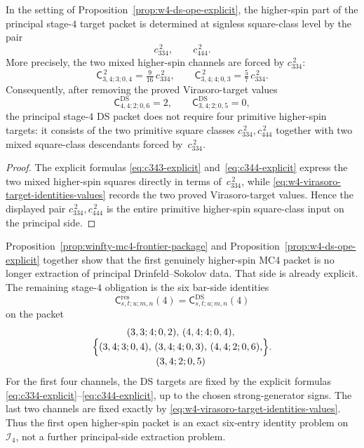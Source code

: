 \begin{corollary}
\label{cor:w4-ds-stage4-square-class-reduction}
In the setting of
Proposition~\ref{prop:w4-ds-ope-explicit}, the higher-spin part of the
principal stage-$4$ target packet is determined at signless
square-class level by the pair
\[
c_{334}^{\,2},
\qquad
c_{444}^{\,2}.
\]
More precisely, the two mixed higher-spin channels are forced by
$c_{334}^{\,2}$:
\[
\mathsf{C}_{3,4;3;0,4}^{\,2}
= \tfrac{9}{16}\,c_{334}^{\,2},
\qquad
\mathsf{C}_{3,4;4;0,3}^{\,2}
= \tfrac{5}{7}\,c_{334}^{\,2}.
\]
Consequently, after removing the proved Virasoro-target values
\[
\mathsf{C}^{\mathrm{DS}}_{4,4;2;0,6}=2,
\qquad
\mathsf{C}^{\mathrm{DS}}_{3,4;2;0,5}=0,
\]
the principal stage-$4$ DS packet does not require four primitive
higher-spin targets: it consists of the two primitive square classes
$c_{334}^{\,2},c_{444}^{\,2}$ together with two mixed square-class
descendants forced by~$c_{334}^{\,2}$.
\end{corollary}

\begin{proof}
The explicit formulas
\eqref{eq:c343-explicit} and~\eqref{eq:c344-explicit} express the two
mixed higher-spin squares directly in terms of~$c_{334}^{\,2}$, while
\eqref{eq:w4-virasoro-target-identities-values} records the two
proved Virasoro-target values. Hence the displayed pair
$c_{334}^{\,2},c_{444}^{\,2}$ is the entire primitive higher-spin
square-class input on the principal side.
\end{proof}

\begin{remark}
\label{rem:winfty-stage4-exact-identity-packet}
Proposition~\ref{prop:winfty-mc4-frontier-package} and
Proposition~\ref{prop:w4-ds-ope-explicit} together show that the first
genuinely higher-spin MC4 packet is no longer extraction of principal
Drinfeld--Sokolov data. That side is already explicit. The remaining
stage-$4$ obligation is the six bar-side identities
\[
\mathsf{C}^{\mathrm{res}}_{s,t;u;m,n}(4)
=
\mathsf{C}^{\mathrm{DS}}_{s,t;u;m,n}(4)
\]
on the packet
\[
\Bigl\{
\begin{gathered}
(3,3;4;0,2),\,
(4,4;4;0,4),\\
(3,4;3;0,4),\,
(3,4;4;0,3),\,
(4,4;2;0,6),\\
(3,4;2;0,5)
\end{gathered}
\Bigr\}.
\]
For the first four channels, the DS targets are fixed by the explicit
formulas \eqref{eq:c334-explicit}--\eqref{eq:c344-explicit}, up to the
chosen strong-generator signs. The last two channels are fixed exactly
by \eqref{eq:w4-virasoro-target-identities-values}. Thus the first open higher-spin
packet is an exact six-entry identity problem on~$\mathcal{I}_4$, not a
further principal-side extraction problem.
\end{remark}

